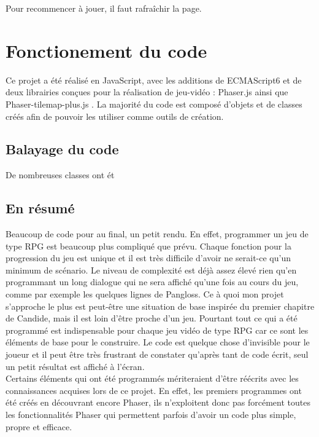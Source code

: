 \documentclass[11pt]{article}
\begin{document}
Pour recommencer à jouer, il faut rafraîchir la page.



\section{Fonctionement du code}
Ce projet a été réalisé en JavaScript, avec les additions de ECMAScript6 et de deux librairies conçues pour la réalisation de jeu-vidéo : Phaser.js ainsi que Phaser-tilemap-plus.js . La majorité du code est composé d'objets et de classes créés afin de pouvoir les utiliser comme outils de création.\\

\subsection{Balayage du code}
De nombreuses classes ont ét
\subsection{En résumé}
Beaucoup de code pour au final, un petit rendu. En effet, programmer un jeu de type RPG est beaucoup plus compliqué que prévu. Chaque fonction pour la progression du jeu est unique et il est très difficile d'avoir ne serait-ce qu'un minimum de scénario. Le niveau de complexité est déjà assez élevé rien qu'en programmant un long dialogue qui ne sera affiché qu'une fois au cours du jeu, comme par exemple les quelques lignes de Pangloss. Ce à quoi mon projet s'approche le plus est peut-être une situation de base inspirée du premier chapitre de Candide, mais il est loin d'être proche d'un jeu. Pourtant tout ce qui a été programmé est indispensable pour chaque jeu vidéo de type RPG car ce sont les éléments de base pour le construire. Le code est quelque chose d'invisible pour le joueur et il peut être très frustrant de constater qu'après tant de code écrit, seul un petit résultat est affiché à l'écran. \\

Certains éléments qui ont été programmés mériteraient d'être réécrits avec les connaissances acquises lors de ce projet. En effet, les premiers programmes ont été créés en découvrant encore Phaser, ils n'exploitent donc pas forcément toutes les fonctionnalités Phaser qui permettent parfois d'avoir un code plus simple, propre et efficace.\\

\end{document}
